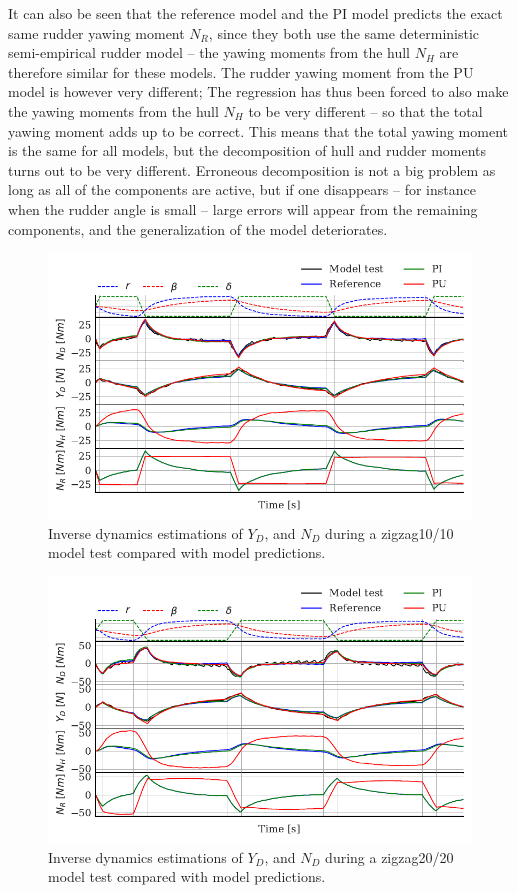 It can also be seen that the reference model and the PI model predicts the exact same rudder yawing moment $N_R$, since they both use the same deterministic semi-empirical rudder model -- the yawing moments from the hull $N_H$ are therefore similar for these models. The rudder yawing moment from the PU model is however very different; The regression has thus been forced to also make the yawing moments from the hull $N_H$ to be very different -- so that the total yawing moment adds up to be correct. 
This means that the total yawing moment is the same for all models, but the decomposition of hull and rudder moments turns out to be very different. Erroneous decomposition is not a big problem as long as all of the components are active, but if one disappears -- for instance when the rudder angle is small -- large errors will appear from the remaining components, and the generalization of the model deteriorates.  
\begin{figure}[h]
    \centering
    \includegraphics{figures/results.ID_zigzag10.pdf}
    \caption{Inverse dynamics estimations of $Y_D$, and $N_D$ during a zigzag10/10 model test compared with model predictions.}
    \label{fig:ID_zigzag10}
\end{figure}
\begin{figure}[h]
    \centering
    \includegraphics{figures/results.ID_zigzag20.pdf}
    \caption{Inverse dynamics estimations of $Y_D$, and $N_D$ during a zigzag20/20 model test compared with model predictions.}
    \label{fig:ID_zigzag20}
\end{figure}
\FloatBarrier

